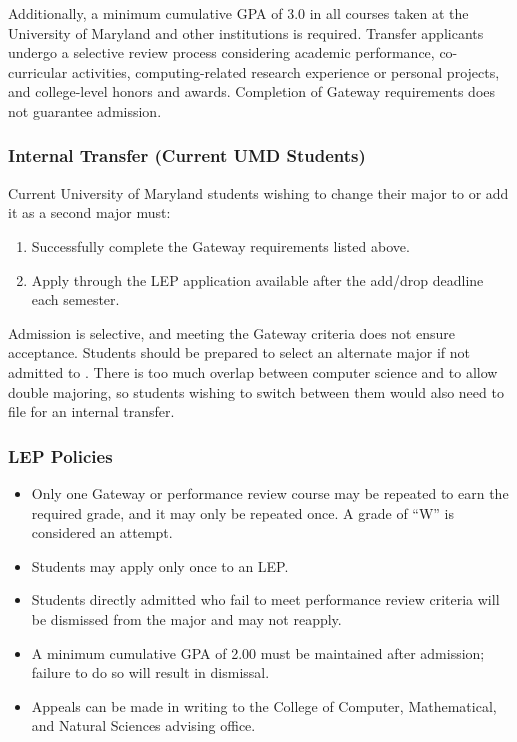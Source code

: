 Additionally, a minimum cumulative GPA of 3.0 in all courses taken at the University of Maryland and other institutions is required. Transfer applicants undergo a selective review process considering academic performance, co-curricular activities, computing-related research experience or personal projects, and college-level honors and awards. Completion of Gateway requirements does not guarantee admission.

\subsubsection*{Internal Transfer (Current UMD Students)}
Current University of Maryland students wishing to change their major to \short{} or add it as a second major must:
\begin{enumerate}
    \item Successfully complete the Gateway requirements listed above.
    \item Apply through the LEP application available after the add/drop deadline each semester.
\end{enumerate}

Admission is selective, and meeting the Gateway criteria does not ensure acceptance. Students should be prepared to select an alternate major if not admitted to \short{}.  There is too much overlap between computer science and \short{} to allow double majoring, so students wishing to switch between them would also need to file for an internal transfer.

\subsubsection*{LEP Policies}
\begin{itemize}
    \item Only one Gateway or performance review course may be repeated to earn the required grade, and it may only be repeated once. A grade of ``W'' is considered an attempt.
    \item Students may apply only once to an LEP.
    \item Students directly admitted who fail to meet performance review criteria will be dismissed from the major and may not reapply.
    \item A minimum cumulative GPA of 2.00 must be maintained after admission; failure to do so will result in dismissal.
    \item Appeals can be made in writing to the College of Computer, Mathematical, and Natural Sciences advising office.
\end{itemize}


